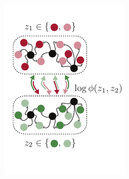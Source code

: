 \begin{figure}[t!]
  \centering
  \begin{subfigure}[b]{1.6in}
    \centering
    \caption{}
    \vspace{-.3in}
    \includegraphics[width=\textwidth]{figures/ch9/example_population.pdf}
    \label{fig:representation_population}
  \end{subfigure}
  \begin{subfigure}[b]{1.9in}
    \centering
    \caption{}
    \vspace{-.3in}

\end{subfigure}
\end{figure}
